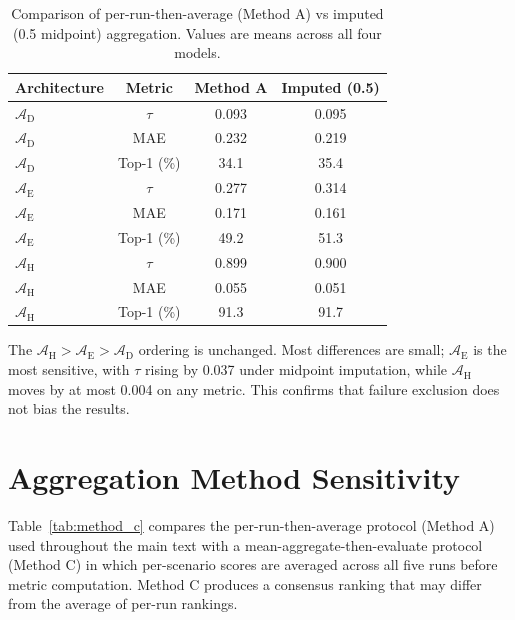 \documentclass[final,3p,times]{elsarticle}
\begin{document}
\begin{table}[htbp]
\begin{threeparttable}
\small\centering
\caption{Comparison of per-run-then-average (Method A) vs imputed (0.5 midpoint) aggregation. Values are means across all four models.}
\label{tab:imputed_comparison}
\begin{tabular}{lccc}
\toprule
Architecture & Metric & Method A & Imputed (0.5) \\
\midrule
$\mathcal{A}_{\text{D}}$ & $\tau$ & 0.093 & 0.095 \\
$\mathcal{A}_{\text{D}}$ & MAE & 0.232 & 0.219 \\
$\mathcal{A}_{\text{D}}$ & Top-1 (\%) & 34.1 & 35.4 \\
$\mathcal{A}_{\text{E}}$ & $\tau$ & 0.277 & 0.314 \\
$\mathcal{A}_{\text{E}}$ & MAE & 0.171 & 0.161 \\
$\mathcal{A}_{\text{E}}$ & Top-1 (\%) & 49.2 & 51.3 \\
$\mathcal{A}_{\text{H}}$ & $\tau$ & 0.899 & 0.900 \\
$\mathcal{A}_{\text{H}}$ & MAE & 0.055 & 0.051 \\
$\mathcal{A}_{\text{H}}$ & Top-1 (\%) & 91.3 & 91.7 \\
\bottomrule
\end{tabular}
\end{threeparttable}
\end{table}

The $\mathcal{A}_{\text{H}} > \mathcal{A}_{\text{E}} > \mathcal{A}_{\text{D}}$ ordering is unchanged. Most differences are small; $\mathcal{A}_{\text{E}}$ is the most sensitive, with $\tau$ rising by 0.037 under midpoint imputation, while $\mathcal{A}_{\text{H}}$ moves by at most 0.004 on any metric. This confirms that failure exclusion does not bias the results.

\section{Aggregation Method Sensitivity}
\label{app:method-c}

Table~\ref{tab:method_c} compares the per-run-then-average protocol (Method A) used throughout the main text with a mean-aggregate-then-evaluate protocol (Method C) in which per-scenario scores are averaged across all five runs before metric computation. Method C produces a consensus ranking that may differ from the average of per-run rankings.
\end{document}
